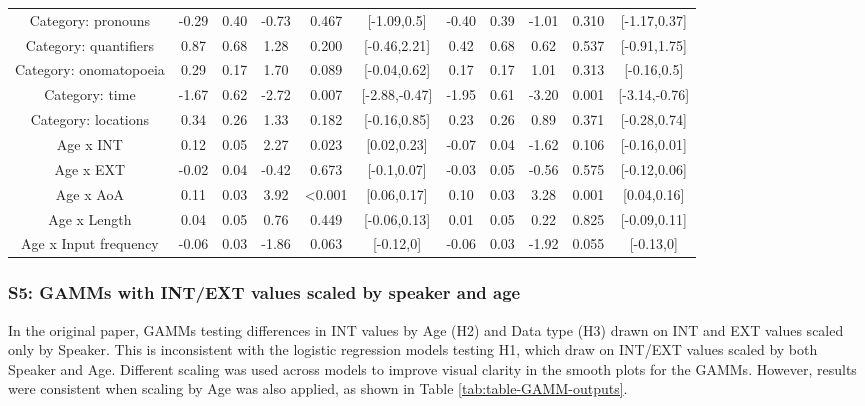 \documentclass[
  man,floatsintext]{apa6}
\begin{document}
\begin{longtable}[t]{ccccccccccc}
Category: pronouns & -0.29 & 0.40 & -0.73 & 0.467 & {}[-1.09,0.5] & -0.40 & 0.39 & -1.01 & 0.310 & {}[-1.17,0.37]\\
Category: quantifiers & 0.87 & 0.68 & 1.28 & 0.200 & {}[-0.46,2.21] & 0.42 & 0.68 & 0.62 & 0.537 & {}[-0.91,1.75]\\
Category: onomatopoeia & 0.29 & 0.17 & 1.70 & 0.089 & {}[-0.04,0.62] & 0.17 & 0.17 & 1.01 & 0.313 & {}[-0.16,0.5]\\
\addlinespace
Category: time & -1.67 & 0.62 & -2.72 & 0.007 & {}[-2.88,-0.47] & -1.95 & 0.61 & -3.20 & 0.001 & {}[-3.14,-0.76]\\
Category: locations & 0.34 & 0.26 & 1.33 & 0.182 & {}[-0.16,0.85] & 0.23 & 0.26 & 0.89 & 0.371 & {}[-0.28,0.74]\\
Age x INT & 0.12 & 0.05 & 2.27 & 0.023 & {}[0.02,0.23] & -0.07 & 0.04 & -1.62 & 0.106 & {}[-0.16,0.01]\\
Age x EXT & -0.02 & 0.04 & -0.42 & 0.673 & {}[-0.1,0.07] & -0.03 & 0.05 & -0.56 & 0.575 & {}[-0.12,0.06]\\
Age x AoA & 0.11 & 0.03 & 3.92 & <0.001 & {}[0.06,0.17] & 0.10 & 0.03 & 3.28 & 0.001 & {}[0.04,0.16]\\
\addlinespace
Age x Length & 0.04 & 0.05 & 0.76 & 0.449 & {}[-0.06,0.13] & 0.01 & 0.05 & 0.22 & 0.825 & {}[-0.09,0.11]\\
Age x Input frequency & -0.06 & 0.03 & -1.86 & 0.063 & {}[-0.12,0] & -0.06 & 0.03 & -1.92 & 0.055 & {}[-0.13,0]\\
\bottomrule
\end{longtable}
\endgroup{}

\newpage

\hypertarget{s5-gamms-with-intext-values-scaled-by-speaker-and-age}{%
\subsubsection{S5: GAMMs with INT/EXT values scaled by speaker and age}\label{s5-gamms-with-intext-values-scaled-by-speaker-and-age}}

In the original paper, GAMMs testing differences in INT values by Age (H2) and Data type (H3) drawn on INT and EXT values scaled only by Speaker. This is inconsistent with the logistic regression models testing H1, which draw on INT/EXT values scaled by both Speaker and Age. Different scaling was used across models to improve visual clarity in the smooth plots for the GAMMs. However, results were consistent when scaling by Age was also applied, as shown in Table \ref{tab:table-GAMM-outputs}.
\end{document}
